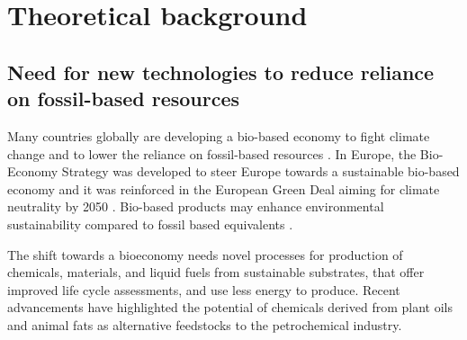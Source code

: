 \chapter{Theoretical background}

\section{Need for new technologies to reduce reliance on fossil-based resources} 



Many countries globally are developing a bio-based economy to fight climate change and to lower the
reliance on fossil-based resources \cite{Zuiderveen2023}. In Europe, 
the Bio-Economy Strategy was developed to steer Europe towards a sustainable 
bio-based economy and it was reinforced in the European Green Deal aiming for 
climate neutrality by 2050 \cite{Research2018}. Bio-based products may enhance environmental 
sustainability compared to fossil based equivalents \cite{Zuiderveen2023}.

The shift towards a bioeconomy needs novel processes for production of chemicals, materials, 
and liquid fuels from sustainable substrates, that offer improved life cycle 
assessments, and use less energy to produce. Recent advancements have highlighted the 
potential of chemicals derived from plant oils and animal fats as alternative 
feedstocks to the petrochemical industry. 

